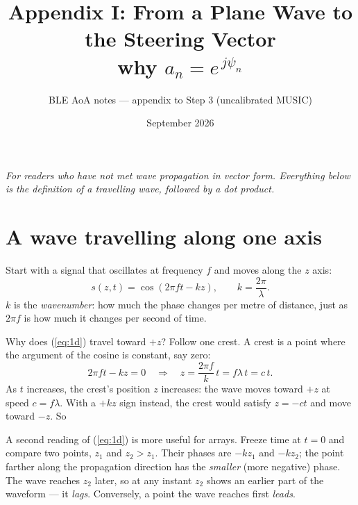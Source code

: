 \documentclass[11pt,a4paper]{article}
\title{Appendix I: From a Plane Wave to the Steering Vector\\[4pt]\large why $a_n = e^{\,j\psi_n}$}
\author{BLE AoA notes --- appendix to Step 3 (uncalibrated MUSIC)}
\date{September 2026}
\begin{document}
\maketitle

\noindent\emph{For readers who have not met wave propagation in vector form. Everything below is the definition of a travelling wave, followed by a dot product.}

\section{A wave travelling along one axis}
Start with a signal that oscillates at frequency $f$ and moves along the $z$ axis:
\begin{equation}
  s(z, t) = \cos\!\left(2\pi f t - k z\right), \qquad k = \frac{2\pi}{\lambda}.
  \label{eq:1d}
\end{equation}
$k$ is the \emph{wavenumber}: how much the phase changes per metre of distance, just as $2\pi f$ is how much it changes per second of time.

Why does (\ref{eq:1d}) travel toward $+z$? Follow one crest. A crest is a point where the argument of the cosine is constant, say zero:
\[
  2\pi f t - k z = 0 \quad\Longrightarrow\quad z = \frac{2\pi f}{k}\, t = f\lambda\, t = c\, t .
\]
As $t$ increases, the crest's position $z$ increases: the wave moves toward $+z$ at speed $c = f\lambda$. With a $+kz$ sign instead, the crest would satisfy $z = -ct$ and move toward $-z$. So

\begin{center}
\end{center}

A second reading of (\ref{eq:1d}) is more useful for arrays. Freeze time at $t = 0$ and compare two points, $z_1$ and $z_2 > z_1$. Their phases are $-kz_1$ and $-kz_2$; the point farther along the propagation direction has the \emph{smaller} (more negative) phase. The wave reaches $z_2$ later, so at any instant $z_2$ shows an earlier part of the waveform --- it \emph{lags}. Conversely, a point the wave reaches first \emph{leads}.
\end{document}
